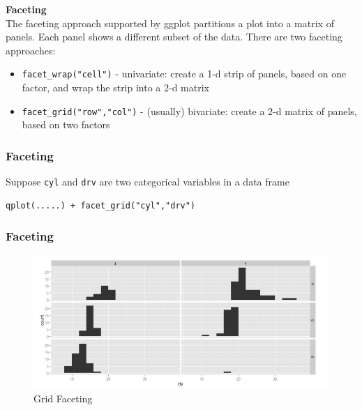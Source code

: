 \documentclass{beamer}
\begin{document}
\begin{frame}
	\Large
	\noindent \textbf{Faceting}\\
	The faceting approach supported by ggplot partitions a plot into a matrix of panels. Each panel shows a different subset of the data.
	There are two faceting approaches:
	
	\begin{itemize}
		\item \texttt{facet\_wrap("cell")} - univariate: create a 1-d strip of panels, based on one factor, and wrap the strip into a 2-d matrix
		\item \texttt{facet\_grid("row","col")} - (usually) bivariate: create a 2-d matrix of panels, based on two factors
	\end{itemize}
\end{frame}
\begin{frame}[fragile]
	\frametitle{Faceting}
\Large
Suppose \texttt{cyl} and \texttt{drv} are two categorical variables in a data frame
\begin{framed}
\begin{verbatim}
qplot(.....) + facet_grid("cyl","drv")
\end{verbatim}
\end{framed}

\end{frame}
\begin{frame}
	\frametitle{Faceting}
	\begin{figure}
\centering
\includegraphics[width=1.1\linewidth]{gridfacetting}
\caption{Grid Faceting}
\label{fig:gridfacetting}
\end{figure}

\end{frame}
\end{document}
